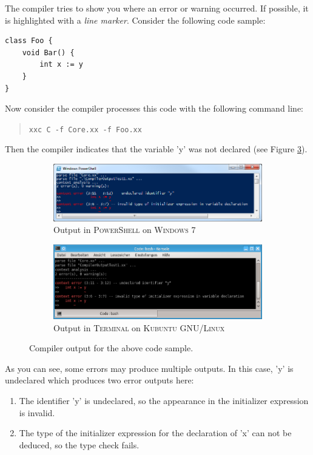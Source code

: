 \documentclass{report}
\def\windows{\textsc{Windows}\xspace}
\def\linux{\textsc{GNU/Linux}\xspace}
\begin{document}
The compiler tries to show you where an error or warning occurred.
If possible, it is highlighted with a \textit{line marker}. Consider the following code sample:
\begin{lstlisting}
class Foo {
    void Bar() {
        int x := y
    }
}
\end{lstlisting}
Now consider the compiler processes this code with the following command line:
\begin{quote}
\texttt{xxc C -f Core.xx -f Foo.xx}
\end{quote}
Then the compiler indicates that the variable 'y' was not declared (see Figure \ref{fig:compiler-output}).
\begin{figure}[ht]
	\centering
	\begin{subfigure}[here]{0.9 \textwidth}
		\includegraphics[width=\textwidth]{images/compiler-output-win32}
		\caption{Output in \textsc{PowerShell} on \windows 7}
		\label{fig:compiler-output-win32}
	\end{subfigure}
	\begin{subfigure}[here]{0.9 \textwidth}
		\includegraphics[width=\textwidth]{images/compiler-output-linux}
		\caption{Output in \textsc{Terminal} on \textsc{Kubuntu} \linux}
		\label{fig:compiler-output-linux}
	\end{subfigure}
	\caption{Compiler output for the above code sample.}
	\label{fig:compiler-output}
\end{figure}
As you can see, some errors may produce multiple outputs. In this case, 'y' is undeclared which produces two error
outputs here:
\begin{enumerate}
	\item The identifier 'y' is undeclared, so the appearance in the initializer expression is invalid.
	\item The type of the initializer expression for the declaration of 'x' can not be deduced, so the type check fails.
\end{enumerate}
\end{document}
